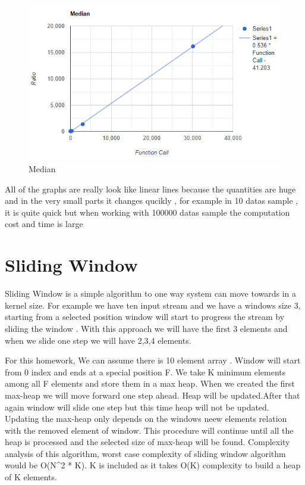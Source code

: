\documentclass[a4paper, 12pt, titlepage]{article}
\begin{document}
    \begin{figure}[H]
	\centering
	\caption{Median}
	\label{fig:Median}
	\includegraphics[width=.85\textwidth]{hfd7.PNG} %
\end{figure}

All of the graphs are really look like linear lines because the quantities are huge and in the very small parts it changes qucikly , for example in 10 datas sample , it is quite quick but when working with 100000 datas sample the computation cost and time is large

\section{Sliding Window}

Sliding Window is a simple algorithm to one way system can move towards in a kernel size. For example we have ten input stream and we have a windows size 3, starting from a selected position window will 
start to progress the stream by sliding the window . With this approach we will have the first 3 elements and when we slide one step we will have 2,3,4 elements.

    For this homework,  We can assume there is 10 element array . Window will start from 0 index and ends at a special position F. We take K minimum elements  among all F elements and store them in a max heap. When we created the first max-heap we will move forward one step ahead. Heap will be updated.After that again window will slide one step but this time heap will not be updated. Updating the max-heap only depends on the windows neew elements relation with the removed element of window. This procedure will continue until all the heap is processed and the selected size of max-heap will be found.
    Complexity analysis of this algorithm, worst case complexity of sliding window algorithm would be O(N^2 * K). K is included as it takes O(K) complexity to build a heap of K elements.
\end{document}
